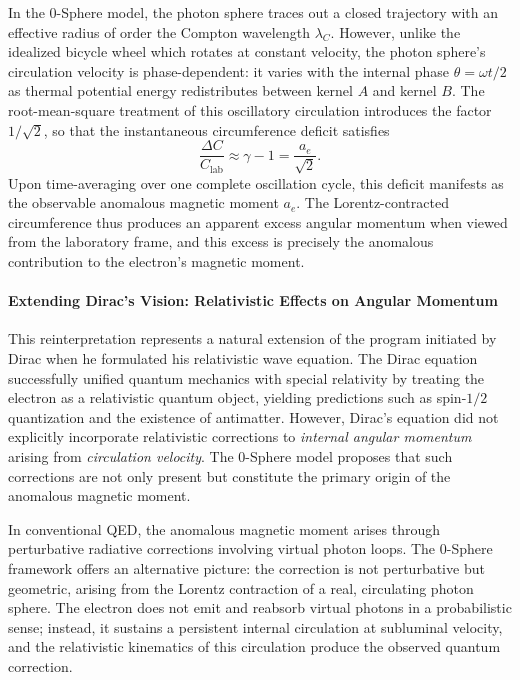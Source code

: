 \documentclass[12pt,letterpaper]{article}
\begin{document}
In the 0-Sphere model, the photon sphere traces out a closed trajectory with an effective radius of order the Compton wavelength $\lambda_C$. However, unlike the idealized bicycle wheel which rotates at constant velocity, the photon sphere's circulation velocity is phase-dependent: it varies with the internal phase $\theta = \omega t/2$ as thermal potential energy redistributes between kernel $A$ and kernel $B$. The root-mean-square treatment of this oscillatory circulation introduces the factor $1/\sqrt{2}$, so that the instantaneous circumference deficit satisfies
\begin{equation}
  \frac{\Delta C}{C_{\mathrm{lab}}} \approx \gamma - 1 = \frac{a_e}{\sqrt{2}}.
\end{equation}
Upon time-averaging over one complete oscillation cycle, this deficit manifests as the observable anomalous magnetic moment $a_e$. The Lorentz-contracted circumference thus produces an apparent excess angular momentum when viewed from the laboratory frame, and this excess is precisely the anomalous contribution to the electron's magnetic moment.

\paragraph{Extending Dirac's Vision: Relativistic Effects on Angular Momentum}

This reinterpretation represents a natural extension of the program initiated by Dirac when he formulated his relativistic wave equation. The Dirac equation successfully unified quantum mechanics with special relativity by treating the electron as a relativistic quantum object, yielding predictions such as spin-$1/2$ quantization and the existence of antimatter. However, Dirac's equation did not explicitly incorporate relativistic corrections to \textit{internal angular momentum} arising from \textit{circulation velocity}. The 0-Sphere model proposes that such corrections are not only present but constitute the primary origin of the anomalous magnetic moment.

In conventional QED, the anomalous magnetic moment arises through perturbative radiative corrections involving virtual photon loops. The 0-Sphere framework offers an alternative picture: the correction is not perturbative but geometric, arising from the Lorentz contraction of a real, circulating photon sphere. The electron does not emit and reabsorb virtual photons in a probabilistic sense; instead, it sustains a persistent internal circulation at subluminal velocity, and the relativistic kinematics of this circulation produce the observed quantum correction.
\end{document}

